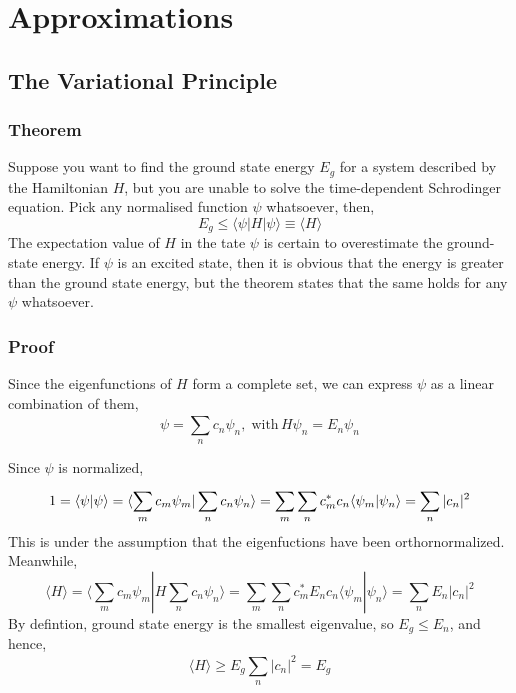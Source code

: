 \chapter{Approximations}
\section{The Variational Principle}
\subsection{Theorem}
Suppose you want to find the ground state energy $E_g$ for a system described by the Hamiltonian $H$, but you are unable to solve the time-dependent Schrodinger equation. Pick any normalised function $\psi$ whatsoever, then,
\begin{equation}
	E_g\le\langle\psi|H|\psi\rangle\equiv\langle H\rangle
\end{equation}
The expectation value of $H$ in the tate $\psi$ is certain to overestimate the ground-state energy. If $\psi$ is an excited state, then it is obvious that the energy is greater than the ground state energy, but the theorem states that the same holds for any $\psi$ whatsoever.

\subsection{Proof}
Since the eigenfunctions of $H$ form a complete set, we can express $\psi$ as a linear combination of them,
\begin{equation*}
	\psi=\sum_{n}^{}c_n\psi_n, \; \text{with} \, H\psi_n=E_n\psi_n
\end{equation*}

Since $\psi$ is normalized,
\begin{equation*}
	1=\braket{\psi}{\psi}=\langle \sum_{m}^{}c_m\psi_m|\sum_{n}^{}c_n\psi_n\rangle=\sum_{m}^{}\sum_{n}^{}c^*_mc_n\langle\psi_m|\psi_n\rangle=\sum_{n}^{}|c_n|^2
\end{equation*}
This is under the assumption that the eigenfuctions have been orthornormalized. Meanwhile,
\begin{equation*}
	\langle H\rangle=\langle \sum_{m}^{}c_m\psi_m|H\sum_{n}^{}c_n\psi_n\rangle=\sum_{m}^{}\sum_{n}^{}c^*_mE_nc_n\langle\psi_m|\psi_n\rangle=\sum_{n}^{}E_n|c_n|^2
\end{equation*}
By defintion, ground state energy is the smallest eigenvalue, so $E_g\le E_n$, and hence,
\begin{equation*}
	\langle H\rangle\ge E_g\sum_{n}^{}|c_n|^2=E_g
\end{equation*}

